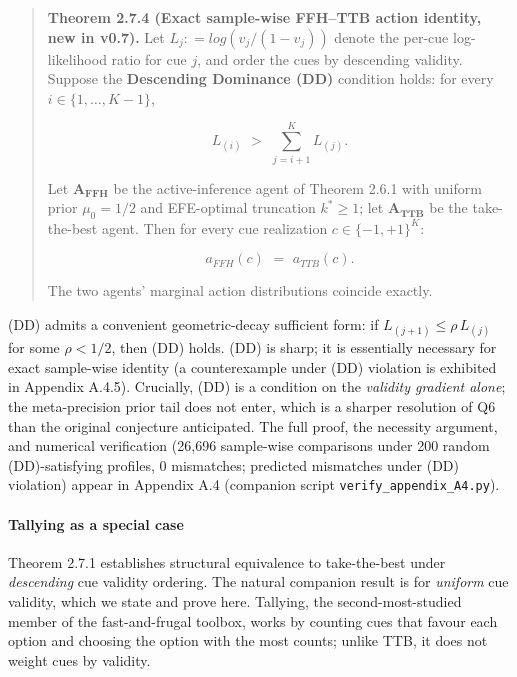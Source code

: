 \documentclass{article}
\begin{document}
\begin{quote}
\textbf{Theorem 2.7.4 (Exact sample-wise FFH--TTB action identity, new
in v0.7).} Let \(L_{j}: = log(v_{j}/(1 - v_{j}))\) denote the per-cue
log-likelihood ratio for cue \(j\), and order the cues by descending
validity. Suppose the \textbf{Descending Dominance (DD)} condition
holds: for every \(i \in \{ 1,\ldots,K - 1\}\),

\[L_{(i)}\mspace{6mu} > \mspace{6mu}\sum_{j = i + 1}^{K}L_{(j)}.\]

Let \(\mathbf{A}_{\mathbf{FFH}}\) be the active-inference agent of
Theorem 2.6.1 with uniform prior \(\mu_{0} = 1/2\) and EFE-optimal
truncation \(k^{*} \geq 1\); let \(\mathbf{A}_{\mathbf{TTB}}\) be the
take-the-best agent. Then for every cue realization
\(c \in \{ - 1, + 1\}^{K}\):

\[a_{FFH}(c)\mspace{6mu} = \mspace{6mu} a_{TTB}(c).\]

The two agents' marginal action distributions coincide exactly.
\end{quote}

(DD) admits a convenient geometric-decay sufficient form: if
\(L_{(j + 1)} \leq \rho\, L_{(j)}\) for some \(\rho < 1/2\), then (DD)
holds. (DD) is sharp; it is essentially necessary for exact sample-wise
identity (a counterexample under (DD) violation is exhibited in Appendix
A.4.5). Crucially, (DD) is a condition on the \emph{validity gradient
alone}; the meta-precision prior tail does not enter, which is a sharper
resolution of Q6 than the original conjecture anticipated. The full
proof, the necessity argument, and numerical verification (26,696
sample-wise comparisons under 200 random (DD)-satisfying profiles, 0
mismatches; predicted mismatches under (DD) violation) appear in
Appendix A.4 (companion script \texttt{verify\_appendix\_A4.py}).

\paragraph{Tallying as a special case}\label{tallying-as-a-special-case}

Theorem 2.7.1 establishes structural equivalence to take-the-best under
\emph{descending} cue validity ordering. The natural companion result is
for \emph{uniform} cue validity, which we state and prove here.
Tallying, the second-most-studied member of the fast-and-frugal toolbox,
works by counting cues that favour each option and choosing the option
with the most counts; unlike TTB, it does not weight cues by validity.
\end{document}
